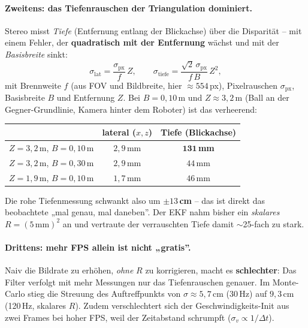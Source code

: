 \paragraph{Zweitens: das Tiefenrauschen der Triangulation dominiert.} Stereo misst
\emph{Tiefe} (Entfernung entlang der Blickachse) über die Disparität -- mit einem
Fehler, der \textbf{quadratisch mit der Entfernung} wächst und mit der
\emph{Basisbreite} sinkt:
\begin{equation}
\sigma_{\text{lat}} = \frac{\sigma_{\text{px}}}{f}\,Z, \qquad
\sigma_{\text{tiefe}} = \frac{\sqrt{2}\,\sigma_{\text{px}}}{f\,B}\,Z^2,
\end{equation}
mit Brennweite $f$ (aus FOV und Bildbreite, hier $\approx554\,$px),
Pixelrauschen $\sigma_{\text{px}}$, Basisbreite $B$ und Entfernung $Z$. Bei
$B=0{,}10\,$m und $Z\approx3{,}2\,$m (Ball an der Gegner-Grundlinie, Kamera
hinter dem Roboter) ist das verheerend:
\begin{center}\small
\begin{tabular}{lcc}
\toprule
 & lateral ($x,z$) & \textbf{Tiefe (Blickachse)} \\
\midrule
$Z=3{,}2\,$m, $B=0{,}10\,$m & $2{,}9\,$mm & $\mathbf{131\,}$\textbf{mm} \\
$Z=3{,}2\,$m, $B=0{,}30\,$m & $2{,}9\,$mm & $44\,$mm \\
$Z=1{,}9\,$m, $B=0{,}10\,$m & $1{,}7\,$mm & $46\,$mm \\
\bottomrule
\end{tabular}
\end{center}
\noindent Die rohe Tiefenmessung schwankt also um \textbf{$\pm13\,$cm} -- das ist
direkt das beobachtete „mal genau, mal daneben''. Der EKF nahm bisher ein
\emph{skalares} $R=(5\,\text{mm})^2$ an und vertraute der verrauschten Tiefe damit
$\sim$25-fach zu stark.

\paragraph{Drittens: mehr FPS allein ist nicht „gratis''.} Naiv die Bildrate zu
erhöhen, \emph{ohne} $R$ zu korrigieren, macht es \textbf{schlechter}: Das Filter
verfolgt mit mehr Messungen nur das Tiefenrauschen genauer. Im Monte-Carlo stieg
die Streuung des Auftreffpunkts von $\sigma\approx5{,}7\,$cm (30\,Hz) auf
$9{,}3\,$cm (120\,Hz, skalares $R$). Zudem verschlechtert sich der
Geschwindigkeits-Init aus zwei Frames bei hoher FPS, weil der Zeitabstand
schrumpft ($\sigma_v\propto1/\Delta t$).

